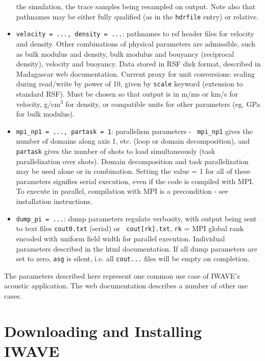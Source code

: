 \begin{itemize}
  the simulation, the trace samples being resampled on output. Note
  also that pathnames may be either fully qualified (as in the {\tt hdrfile}
  entry) or relative.
\item {\tt velocity = ..., density = ...}: pathnames to rsf header
  files for velocity and density. Other combinations of physical
  parameters are admissible, such as bulk modulus and density, bulk
  modulus and bouyancy (reciprocal density), velocity and
  buoyancy. Data stored in RSF disk format, described in Madagascar
  web documentation. Current proxy for unit conversions: scaling
  during read/write by power of 10, given by {\tt scale} keyword
  (extension to standard RSF). Must be chosen so that output is in
  m/ms or km/s for velocity, g/cm$^3$ for density, or compatible units
  for other parameters (eg. GPa for bulk modulus).
\item {\tt mpi\_np1 = ..., partask = 1}: parallelism parameters - {\tt
    mpi\_np1} gives the number of domains along axis 1, etc. (loop or
  domain decomposition), and
  {\tt partask} gives the number of shots to load simultaneously
  (task parallelization over shots). Domain decomposition and task
  parallelization may be used alone or in combination. Setting the
  value = 1 for all of these parameters signifies serial execution, even if the
  code is compiled with MPI. To execute in parallel, compilation with
  MPI is a precondition - see installation instructions.
\item {\tt dump\_pi = ...}: dump parameters regulate verbosity, with
  output being sent to text files {\tt cout0.txt} (serial) or {\tt
    cout[rk].txt}, {\tt rk} = MPI global rank encoded with uniform field width for
  parallel execution. Individual parameters described in the html
  documentation. If all dump parameters are set to zero, {\tt asg} is
  silent, i.e. all {\tt cout...} files will be empty on completion. 
\end{itemize}

The parameters described here represent one common use case of IWAVE's
acoustic application. The web documentation describes a number of
other use cases.

\appendix
\section{Downloading and Installing IWAVE}

